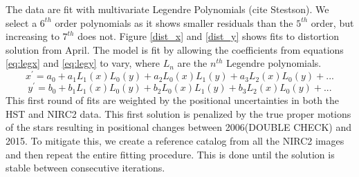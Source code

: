 The data are fit with multivariate Legendre Polynomials (cite Stestson).  We select a $6^{th}$ order polynomials as it shows smaller residuals than the $5^{th}$ order, but increasing to $7^{th}$ does not.  Figure \ref{dist_x} and \ref{dist_y} shows fits to distortion solution from April.  The model is fit by allowing the coefficients from equations \ref{eq:legx} and \ref{eq:legy} to vary, where $L_{n}$ are the $n^{th}$ Legendre polynomials.  
\begin{equation}
x^{'} = a_{0} + a_{1}L_{1}(x)L_{0}(y) +  a_{2}L_{0}(x)L_{1}(y) + a_{3}L_{2}(x)L_{0}(y)+...
\label{eq:legx}
\end{equation}
\begin{equation}
y^{'} = b_{0} + b_{1}L_{1}(x)L_{0}(y) +  b_{2}L_{0}(x)L_{1}(y) + b_{3}L_{2}(x)L_{0}(y)+...
\label{eq:legy}
\end{equation}
This first round of fits are weighted by the positional uncertainties in both the HST and NIRC2 data.  This first solution is penalized by the true proper motions of the stars resulting in positional changes between 2006(DOUBLE CHECK) and 2015.  To mitigate this, we create a reference catalog from all the NIRC2 images and then repeat the entire fitting procedure.  This is done until the solution is stable between consecutive iterations.  


